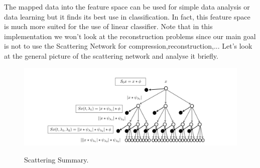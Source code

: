 \documentclass[a4paper]{report}
\begin{document}
The mapped data into the feature space can be used for simple data analysis or data learning but it finds its best use in classification. In fact, this feature space is much more suited for the use of linear classifier.
Note that in this implementation we won't look at the reconstruction problems since our main goal is not to use the Scattering Network for compression,reconstruction,...
Let's look at the general picture of the scattering network and analyse it briefly.
\\
\begin{figure}[H]
\begin{center}
\includegraphics[scale=0.23]{scattering.png}\label{oo}\caption{Scattering Summary.\cite{m2}}
\end{center}
\end{figure}
\end{document}

